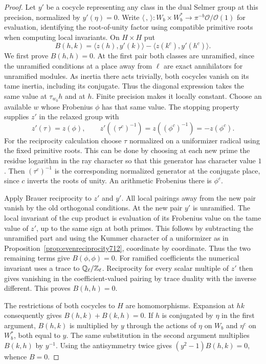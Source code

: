 \documentclass[a4paper,11pt]{article}
\theoremstyle{definition}
\theoremstyle{remark}
\newcommand{\ZZ}{\mathbb Z}\newcommand{\ord}{\operatorname{ord}}
\numberwithin{equation}{section}
\begin{document}
\begin{proof}
Let \(y'\) be a cocycle representing any class in the dual Selmer
group at this precision, normalized by \(y'(\eta)=0\). Write
\(\langle\, ,\,\rangle:W_b\times W_b^*\to
\pi^{-b}\mathcal O/\mathcal O(1)\) for evaluation, identifying the
root-of-unity factor using compatible primitive roots when computing
local invariants. On \(H\times H\) put
\[
 B(h,k)=\langle z(h),y'(k)\rangle
                          -\langle z(k^c),y'(h^c)\rangle .
\]
We first prove \(B(h,h)=0\). At the first pair both classes are
unramified, since the unramified conditions at a place away from
\(\ell\) are exact annihilators for unramified modules. As inertia
there acts trivially, both cocycles vanish on its tame inertia,
including its conjugate. Thus the diagonal expression takes the same
value at \(\tau_{w_0}h\) and at \(h\). Finite precision makes it
locally constant. Choose an available \(w\) whose Frobenius \(\phi\)
has that same value. The stopping property supplies \(z'\) in the
relaxed group with
\[
        z'(\tau)=z(\phi),\qquad
        z'((\tau^c)^{-1})=z((\phi^c)^{-1})=-z(\phi^c).
\]
For the reciprocity calculation choose \(\tau\) normalized on a
uniformizer radical using the fixed primitive roots. This can be done
by choosing at each new prime the residue logarithm in
the ray character so that this generator has character value \(1\).
Then \((\tau^c)^{-1}\) is the corresponding normalized generator at
the conjugate place, since \(c\) inverts the roots of unity. An
arithmetic Frobenius there is \(\phi^c\).

Apply Brauer reciprocity to \(z'\) and \(y'\). All local pairings
away from the new pair vanish by the old orthogonal conditions.
At the new pair \(y'\) is unramified. The local invariant of the
cup product is evaluation of its Frobenius value on the tame value
of \(z'\), up to the same sign at both primes. This follows by
subtracting the unramified part and using the Kummer character of a
uniformizer as in Proposition~\ref{prop:evenreciprocity712}, coordinate
by coordinate. Thus the two remaining terms give \(B(\phi,\phi)=0\).
For ramified coefficients the numerical invariant uses a trace to
\(\QQ_\ell/\ZZ_\ell\). Reciprocity for every scalar multiple of \(z'\)
then gives vanishing in the coefficient-valued pairing
by trace duality with the inverse different. This proves \(B(h,h)=0\).

The restrictions of both cocycles to \(H\) are homomorphisms.
Expansion at \(hk\) consequently gives \(B(h,k)+B(k,h)=0\).
If \(h\) is conjugated by \(\eta\) in the first argument, \(B(h,k)\)
is multiplied by \(y\) through the actions of
\(\eta\) on \(W_b\) and \(\eta^c\) on \(W_b^*\), both equal to \(y\).
The same substitution in the second argument multiplies \(B(k,h)\)
by \(y^{-1}\). Using the antisymmetry twice gives
\((y^2-1)B(h,k)=0\), whence \(B=0\).


\end{proof}
\end{document}
